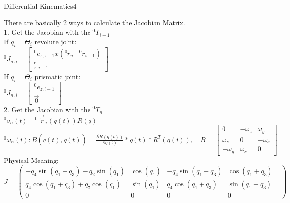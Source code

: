 \begin{questions}
\begin{question}{Differential Kinematics}{4}
\begin{answer}
	
	There are basically 2 ways to calculate the Jacobian Matrix. \\
	\noindent\hspace*{20mm}1. Get the Jacobian with the $^0T_{i-1}$\\
	\noindent\hspace*{25mm} If $q_i = \Theta_i$ revolute joint:\\
	\noindent\hspace*{30mm} $^0J_{n,i} = \begin{bmatrix}
		^0e_{z,i-1} x (^0r_n - ^0r_{i-1}) \\ ^e_{z,i-1}
		\end{bmatrix}$\\
			\noindent\hspace*{25mm} If $q_i = \Theta_i$ prismatic joint:\\
			\noindent\hspace*{30mm} $^0J_{n,i} = \begin{bmatrix}
			^0e_{z,i-1} \\\vec{0}
			\end{bmatrix}$\\
		\noindent\hspace*{20mm}2. Get the Jacobian with the $^0T_{n}$\\		
		\noindent\hspace*{25mm} $^0v_n(t)=^0\vec{\dot{r}}_n(q(t)) \dot{R(q)}$\\
		\noindent\hspace*{25mm} $^0\omega_n(t): B(q(t),\dot{q(t)})=\frac{\partial R (q(t))}{\partial q(t)} * \dot{q(t)}* R^T(q(t)), \quad B = \begin{bmatrix}
		0 & -\omega_z &\omega_y \\ \omega_z & 0 & -\omega_x \\ -\omega_y &\omega_x&0
		\end{bmatrix}$\\
	Physical Meaning:\\
	
	\begin{equation}
		J = 
		\begin{pmatrix}
			-q_4\sin(q_1+q_3) - q_2\sin(q_1)& 
			\cos(q_1)& -q_4\sin(q_1+q_3)& \cos(q_1+q_3) \\
			q_4\cos(q_1+q_3)+q_2\cos(q_1)& 
			\sin(q_1)& q_4\cos(q_1+q_3)& \sin(q_1+q_3)\\
			0& 0& 0& 0&
		\end{pmatrix}
	\end{equation}
	

\end{answer}
\end{question}
\end{questions}
